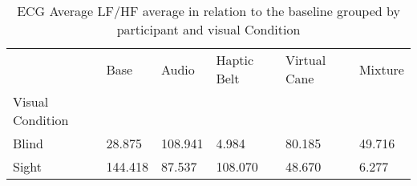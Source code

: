 
\begin{table}[!htb]
\centering
\caption{ECG Average LF/HF average in relation to the baseline grouped by participant and visual Condition}
\label{tab:ecg_lfhf_average_group}
\begin{tabular}{llllll}
\toprule
{} &    Base &   Audio &  Haptic Belt &  Virtual Cane &  Mixture \\
Visual Condition &         &         &              &               &          \\
\midrule
Blind            &  28.875 & 108.941 &        4.984 &        80.185 &   49.716 \\
Sight            & 144.418 &  87.537 &      108.070 &        48.670 &    6.277 \\
\bottomrule
\end{tabular}
\end{table}

